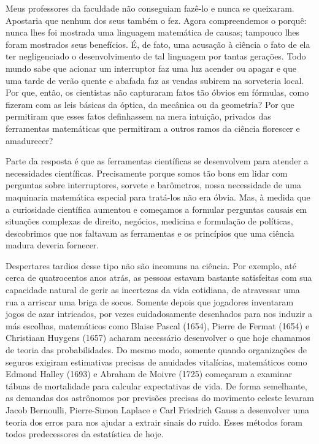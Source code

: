\documentclass[11pt,a5paper,twoside]{book}
\begin{document}
Meus professores da faculdade não conseguiam fazê-lo e nunca se queixaram. Apostaria que nenhum dos seus também o fez. Agora compreendemos o porquê: nunca lhes foi mostrada uma linguagem matemática de causas; tampouco lhes foram mostrados seus benefícios. É, de fato, uma acusação à ciência o fato de ela ter negligenciado o desenvolvimento de tal linguagem por tantas gerações. Todo mundo sabe que acionar um interruptor faz uma luz acender ou apagar e que uma tarde de verão quente e abafada faz as vendas subirem na sorveteria local. Por que, então, os cientistas não capturaram fatos tão óbvios em fórmulas, como fizeram com as leis básicas da óptica, da mecânica ou da geometria? Por que permitiram que esses fatos definhassem na mera intuição, privados das ferramentas matemáticas que permitiram a outros ramos da ciência florescer e amadurecer?

Parte da resposta é que as ferramentas científicas se desenvolvem para atender a necessidades científicas. Precisamente porque somos tão bons em lidar com perguntas sobre interruptores, sorvete e barômetros, nossa necessidade de uma maquinaria matemática especial para tratá-los não era óbvia. Mas, à medida que a curiosidade científica aumentou e começamos a formular perguntas causais em situações complexas de direito, negócios, medicina e formulação de políticas, descobrimos que nos faltavam as ferramentas e os princípios que uma ciência madura deveria fornecer.

Despertares tardios desse tipo não são incomuns na ciência. Por exemplo, até cerca de quatrocentos anos atrás, as pessoas estavam bastante satisfeitas com sua capacidade natural de gerir as incertezas da vida cotidiana, de atravessar uma rua a arriscar uma briga de socos. Somente depois que jogadores inventaram jogos de azar intricados, por vezes cuidadosamente desenhados para nos induzir a más escolhas, matemáticos como Blaise Pascal (1654), Pierre de Fermat (1654) e Christiaan Huygens (1657) acharam necessário desenvolver o que hoje chamamos de teoria das probabilidades. Do mesmo modo, somente quando organizações de seguros exigiram estimativas precisas de anuidades vitalícias, matemáticos como Edmond Halley (1693) e Abraham de Moivre (1725) começaram a examinar tábuas de mortalidade para calcular expectativas de vida. De forma semelhante, as demandas dos astrônomos por previsões precisas do movimento celeste levaram Jacob Bernoulli, Pierre-Simon Laplace e Carl Friedrich Gauss a desenvolver uma teoria dos erros para nos ajudar a extrair sinais do ruído. Esses métodos foram todos predecessores da estatística de hoje.
\end{document}
